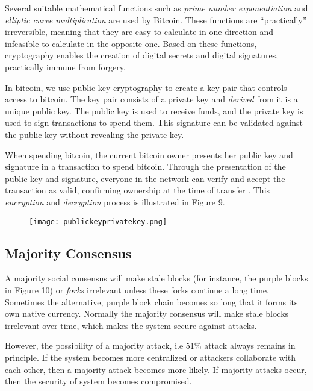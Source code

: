 \documentclass[12pt]{article}
\newcommand{\1}{\mathbbm 1}
\begin{document}
		
		Several suitable mathematical functions such as \textit{prime number exponentiation} and \textit{elliptic curve multiplication} are used by Bitcoin. These functions are ``practically'' irreversible, meaning that they are easy to calculate in one direction and infeasible to calculate in the opposite one. Based on these functions, cryptography enables the creation of digital secrets and digital signatures, practically immune from forgery.
		
		
		In bitcoin, we use public key cryptography to create a key pair that controls access to bitcoin. The key pair consists of a private key and \textit{derived} from it is a unique public key. The public key is used to receive funds, and the private key is used to sign transactions to spend them. This signature can be validated against the public key without revealing the private key.
		
		When spending bitcoin, the current bitcoin owner presents her public key and signature in a transaction to spend bitcoin. Through the presentation of the public key and signature, everyone in the network can verify and accept the transaction as valid, confirming ownership at the time of transfer \cite{andreas2022mastering}. This \textit{encryption} and \textit{decryption} process is illustrated in Figure 9.
		
		\begin{figure}[H]
			\begin{Center}
				\texttt{[image: publickeyprivatekey.png]}		
				\caption{}
			\end{Center}
		\end{figure}
		
		
		\subsection{\textbf{Majority Consensus}}
		
		A majority social consensus will make stale blocks (for instance, the purple blocks in Figure 10) or \textit{forks} irrelevant unless these forks continue a long time. Sometimes the alternative, purple block chain becomes so long that it forms its own native currency. Normally the majority consensus will make stale blocks irrelevant over time, which makes the system secure against attacks. 
		
		However, the possibility of  a majority attack, i.e 51\% attack always remains in principle. If the system becomes more centralized or attackers collaborate with each other, then a majority attack becomes more likely. If majority attacks occur, then the security of system becomes compromised.
		
\end{document}
